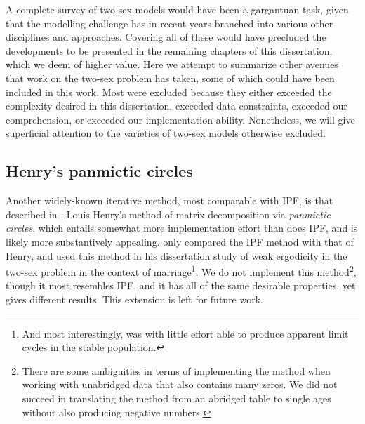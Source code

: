 \label{sec:other}
A complete survey of two-sex models would have been a gargantuan task, given
that the modelling challenge has in recent years branched into various other
disciplines and approaches. Covering all of these would have precluded the
developments to be presented in the remaining chapters of this dissertation,
which we deem of higher value. Here we attempt to summarize other avenues that
work on the two-sex problem has taken, some of which could have been included in this work. Most were excluded because they either exceeded the
complexity desired in this dissertation, exceeded data constraints, exceeded our
comprehension, or exceeded our implementation ability. Nonetheless, we will give
superficial attention to the varieties of two-sex models otherwise excluded.

\subsection{Henry's panmictic circles} 
Another widely-known iterative method, 
most comparable with IPF, is that described in \citet{henry1972nuptiality},
Louis Henry's method of matrix decomposition via \textit{panmictic circles}, which entails somewhat more
implementation effort than does IPF, and is likely more substantively appealing. 
\citet{mc1975models} only compared the
IPF method with that of Henry, and \citet{wijewickrema1980weak} used this method 
in his dissertation study of weak ergodicity in the two-sex problem in the
context of marriage\footnote{And most interestingly, was with little
effort able to produce apparent limit cycles in the stable population.}. We do
not implement this method\footnote{There are some ambiguities in terms of 
implementing the method when working with unabridged data that also contains 
many zeros. We did not succeed in translating the method from an
abridged table to single ages without also producing negative numbers.}, though
it most resembles IPF, and it has all of the same desirable properties, yet
gives different results. This extension is left for future work.

